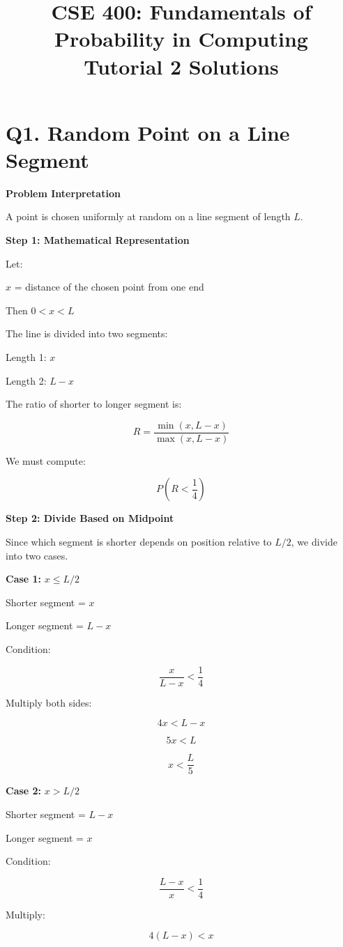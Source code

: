 \documentclass[11pt]{article}
\title{\textbf{CSE 400: Fundamentals of Probability in Computing \\ Tutorial 2 Solutions}}
\date{}
\author{}
\begin{document}
\maketitle

\section*{Q1. Random Point on a Line Segment}

\textbf{Problem Interpretation}

A point is chosen uniformly at random on a line segment of length $L$.

\textbf{Step 1: Mathematical Representation}

Let:

$x$ = distance of the chosen point from one end

Then $0 < x < L$

The line is divided into two segments:

Length 1: $x$

Length 2: $L - x$

The ratio of shorter to longer segment is:

\[
R = \frac{\min(x,L-x)}{\max(x,L-x)}
\]

We must compute:

\[
P\left(R < \frac{1}{4}\right)
\]

\textbf{Step 2: Divide Based on Midpoint}

Since which segment is shorter depends on position relative to $L/2$, we divide into two
cases.

\textbf{Case 1:} $x \le L/2$

Shorter segment = $x$

Longer segment = $L - x$

Condition:

\[
\frac{x}{L-x} < \frac{1}{4}
\]

Multiply both sides:

\[
4x < L - x
\]

\[
5x < L
\]

\[
x < \frac{L}{5}
\]

\textbf{Case 2:} $x > L/2$

Shorter segment = $L - x$

Longer segment = $x$

Condition:

\[
\frac{L-x}{x} < \frac{1}{4}
\]

Multiply:

\[
4(L-x) < x
\]
\end{document}
